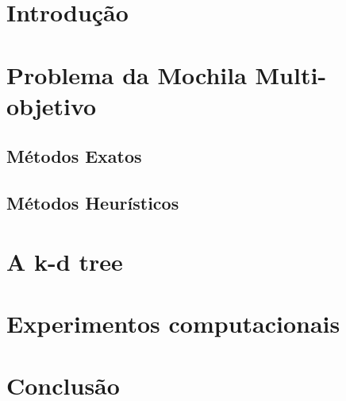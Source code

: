 \documentclass[
12pt,				%
twoside,			%
a4paper,			%
portugues,			%
brazil,				%
]{abntex2}
\begin{document}
\imprimircapa
\imprimirfolhaderosto*


\newpage \phantom{a}



\tableofcontents*

\chapter{Introdução}


\chapter{Problema da Mochila Multi-objetivo}

\section{Métodos Exatos}

\section{Métodos Heurísticos}


\chapter{A k-d tree}


\chapter{Experimentos computacionais}


\chapter{Conclusão}



\postextual


\end{document}
